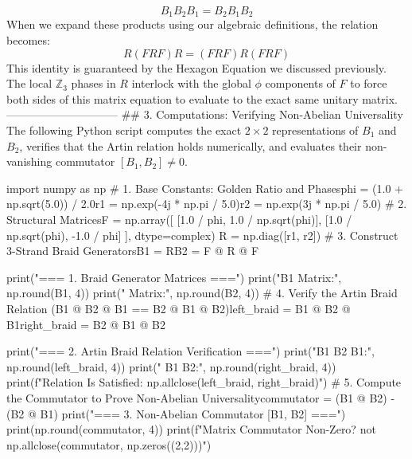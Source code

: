 $$B_1 B_2 B_1 = B_2 B_1 B_2$$ 
When we expand these products using our algebraic definitions, the relation becomes:
$$R (F R F) R = (F R F) R (F R F)$$ 
This identity is guaranteed by the Hexagon Equation we discussed previously. The local $\mathbb{Z}_3$ phases in $R$ interlock with the global $\phi$ components of $F$ to force both sides of this matrix equation to evaluate to the exact same unitary matrix.
------------------------------
## 3. Computations: Verifying Non-Abelian Universality
The following Python script computes the exact $2 \times 2$ representations of $B_1$ and $B_2$, verifies that the Artin relation holds numerically, and evaluates their non-vanishing commutator $[B_1, B_2] \neq 0$.

import numpy as np
# 1. Base Constants: Golden Ratio and Phasesphi = (1.0 + np.sqrt(5.0)) / 2.0r1 = np.exp(-4j * np.pi / 5.0)r2 = np.exp(3j * np.pi / 5.0)
# 2. Structural MatricesF = np.array([
    [1.0 / phi, 1.0 / np.sqrt(phi)],
    [1.0 / np.sqrt(phi), -1.0 / phi]
], dtype=complex)
R = np.diag([r1, r2])
# 3. Construct 3-Strand Braid GeneratorsB1 = RB2 = F @ R @ F

print("=== 1. Braid Generator Matrices ===")
print("B1 Matrix:\n", np.round(B1, 4))
print(" Matrix:\n", np.round(B2, 4))
# 4. Verify the Artin Braid Relation (B1 @ B2 @ B1 == B2 @ B1 @ B2)left_braid = B1 @ B2 @ B1right_braid = B2 @ B1 @ B2

print("\n=== 2. Artin Braid Relation Verification ===")
print("B1 B2 B1:\n", np.round(left_braid, 4))
print(" B1 B2:\n", np.round(right_braid, 4))
print(f"\nArtin Relation Is Satisfied: {np.allclose(left_braid, right_braid)}")
# 5. Compute the Commutator to Prove Non-Abelian Universalitycommutator = (B1 @ B2) - (B2 @ B1)
print("\n=== 3. Non-Abelian Commutator [B1, B2] ===")
print(np.round(commutator, 4))
print(f"\nIs Matrix Commutator Non-Zero? {not np.allclose(commutator, np.zeros((2,2)))}")

